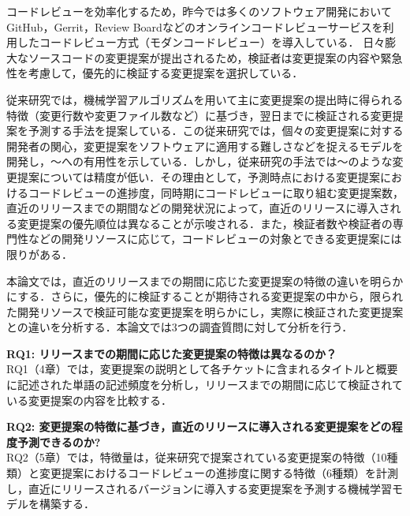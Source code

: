 \documentclass[T,J]{fose} %
\newcommand{\rqone}{リリースまでの期間に応じた変更提案の特徴は異なるのか？}
\newcommand{\rqtwo}{変更提案の特徴に基づき，直近のリリースに導入される変更提案をどの程度予測できるのか?}
\begin{document}
コードレビューを効率化するため，昨今では多くのソフトウェア開発においてGitHub，Gerrit，Review Boardなどのオンラインコードレビューサービスを利用したコードレビュー方式（モダンコードレビュー\cite{quality1}）を導入している．
日々膨大なソースコードの変更提案が提出されるため，検証者は変更提案の内容や緊急性を考慮して，優先的に検証する変更提案を選択している\cite{}．

従来研究では，機械学習アルゴリズムを用いて主に変更提案の提出時に得られる特徴（変更行数や変更ファイル数など）に基づき，翌日までに検証される変更提案を予測する手法を提案している\cite{prioritizer}．この従来研究では，個々の変更提案に対する開発者の関心，変更提案をソフトウェアに適用する難しさなどを捉えるモデルを開発し，〜への有用性を示している．しかし，従来研究の手法では〜のような変更提案については精度が低い．その理由として，予測時点における変更提案におけるコードレビューの進捗度，同時期にコードレビューに取り組む変更提案数，直近のリリースまでの期間などの開発状況によって，直近のリリースに導入される変更提案の優先順位は異なることが示唆される．\cite{}また，検証者数や検証者の専門性などの開発リソースに応じて，コードレビューの対象とできる変更提案には限りがある．


本論文では，直近のリリースまでの期間に応じた変更提案の特徴の違いを明らかにする．さらに，優先的に検証することが期待される変更提案の中から，限られた開発リソースで検証可能な変更提案を明らかにし，実際に検証された変更提案との違いを分析する．本論文では3つの調査質問に対して分析を行う．

\noindent\textbf{RQ1: \rqone}\\
RQ1（4章）では，変更提案の説明として各チケットに含まれるタイトルと概要に記述された単語の記述頻度を分析し，リリースまでの期間に応じて検証されている変更提案の内容を比較する．

\noindent\textbf{RQ2: \rqtwo}\\
RQ2（5章）では，特徴量は，従来研究で提案されている変更提案の特徴（10種類）と変更提案におけるコードレビューの進捗度に関する特徴（6種類）を計測し，直近にリリースされるバージョンに導入する変更提案を予測する機械学習モデルを構築する．
\end{document}
